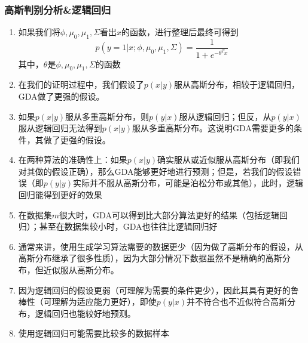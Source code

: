 \subsubsection{高斯判别分析\&逻辑回归}
\begin{enumerate}
	\item 如果我们将$\phi, \mu_0, \mu_1, \Sigma$看出$x$的函数，进行整理后最终可得到
	\begin{equation}
		p(y=1|x; \phi, \mu_0, \mu_1, \Sigma) = \frac{1}{1+e^{-\theta^Tx}}
	\end{equation}
	其中，$\theta$是$\phi, \mu_0, \mu_1, \Sigma$的函数
	\item 在我们的证明过程中，我们假设了$p(x|y)$服从高斯分布，相较于逻辑回归，GDA做了更强的假设。
	\item 如果$p(x|y)$服从多重高斯分布，则$p(y|x)$服从逻辑回归；但反，从$p(y|x)$服从逻辑回归无法得到$p(x|y)$服从多重高斯分布。这说明GDA需要更多的条件，其做了更强的假设。
	\item 在两种算法的准确性上：如果$p(x|y)$确实服从或近似服从高斯分布（即我们对其做的假设正确），那么GDA能够更好地进行预测；但是，若我们的假设错误（即$p(y|y)$实际并不服从高斯分布，可能是泊松分布或其他），此时，逻辑回归能得到更好的效果
	\item 在数据集$m$很大时，GDA可以得到比大部分算法更好的结果（包括逻辑回归）；甚至在数据集较小时，GDA也往往比逻辑回归好
	\item 通常来讲，使用生成学习算法需要的数据更少（因为做了高斯分布的假设，从高斯分布继承了很多性质），因为大部分情况下数据虽然不是精确的高斯分布，但近似服从高斯分布。
	\item 因为逻辑回归的假设更弱（可理解为需要的条件更少），因此其具有更好的鲁棒性（可理解为适应能力更好），即使$p(y|x)$并不符合也不近似符合高斯分布，逻辑回归也能较好地预测。
	\item 使用逻辑回归可能需要比较多的数据样本
\end{enumerate}
















